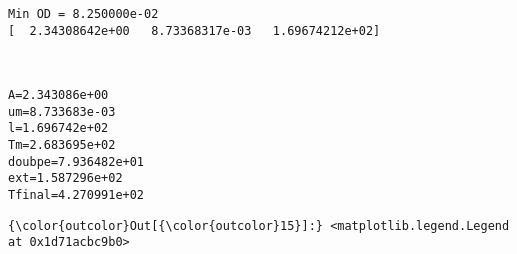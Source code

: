 \documentclass[11pt]{article}
\begin{document}
    \begin{Verbatim}[commandchars=\\\{\}]
Min OD = 8.250000e-02
[  2.34308642e+00   8.73368317e-03   1.69674212e+02]

    \end{Verbatim}

    \begin{center}
    \end{center}
    { \hspace*{\fill} \\}
    
    \begin{Verbatim}[commandchars=\\\{\}]
A=2.343086e+00
um=8.733683e-03
l=1.696742e+02
Tm=2.683695e+02
doubpe=7.936482e+01
ext=1.587296e+02
Tfinal=4.270991e+02

    \end{Verbatim}

            \begin{Verbatim}[commandchars=\\\{\}]
{\color{outcolor}Out[{\color{outcolor}15}]:} <matplotlib.legend.Legend at 0x1d71acbc9b0>
\end{Verbatim}
        
    \begin{center}
    \end{center}
    { \hspace*{\fill} \\}
    
    \begin{center}
    \end{center}
    { \hspace*{\fill} \\}
    
\end{document}
